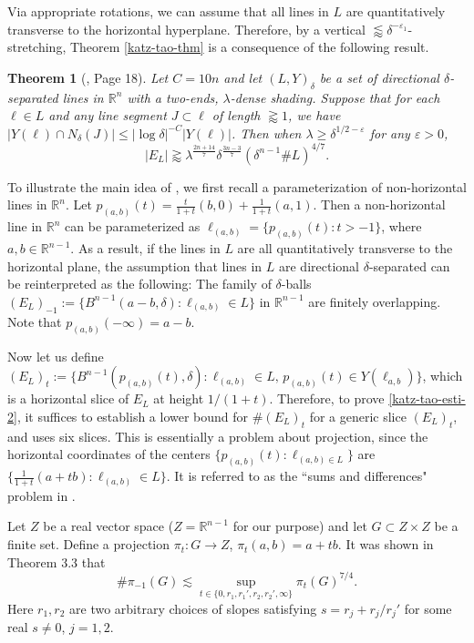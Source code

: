 \documentclass{amsart}
\numberwithin{equation}{section}
\newtheorem{theorem}{Theorem}[section]
\newcommand{\de}{\delta}
\newcommand{\e}{\varepsilon}
\newcommand{\la}{\lambda}
\newcommand{\ZR}{\mathbb{R}}
\begin{document}
Via appropriate rotations, we can assume that all lines in $L$ are quantitatively transverse to the horizontal hyperplane. 
Therefore, by a vertical $\lessapprox\de^{-\e_1}$-stretching, Theorem \ref{katz-tao-thm} is a consequence of the following result.
\begin{theorem}[\cite{Katz-Tao-Kakeya-maximal}, Page 18]
\label{katz-tao-thm-2}
Let $C=10n$ and let $(L,Y)_\de$ be a set of directional $\de$-separated lines in $\ZR^n$ with a two-ends, $\la$-dense shading. 
Suppose that for each $\ell\in L$ and any line segment $J\subset\ell$ of length $\gtrapprox1$, we have $|Y(\ell)\cap N_\de(J)|\leq|\log\de|^{-C}|Y(\ell)|$.
Then when $\la\geq\de^{1/2-\e}$ for any $\e>0$,
\begin{equation}
\label{katz-tao-esti-2}
    |E_L|\gtrapprox \la^\frac{2n+14}{7}\de^{\frac{3n-3}{7}}(\de^{n-1}\#L)^{4/7}.
\end{equation}
\end{theorem}

\smallskip

To illustrate the main idea of \cite{Katz-Tao-Kakeya-maximal}, we first recall a parameterization of non-horizontal lines in $\ZR^n$. Let $p_{(a,b)}(t)=\frac{t}{1+t}(b,0)+\frac{1}{1+t}(a,1)$. Then a non-horizontal line in $\ZR^n$ can be parameterized as $\ell_{(a,b)}=\{p_{(a,b)}(t):t>-1\}$, where $a,b\in\ZR^{n-1}$.
As a result, if the lines in $L$ are all quantitatively transverse to the horizontal plane, the assumption that lines in $L$ are directional $\de$-separated can be reinterpreted as the following: 
The family of $\de$-balls $(E_L)_{-1}:=\{B^{n-1}(a-b,\de): \ell_{(a,b)}\in L\}$ in $\ZR^{n-1}$ are finitely overlapping.
Note that $p_{(a,b)}(-\infty)=a-b$.

Now let us define $(E_L)_{t}:=\{B^{n-1}(p_{(a,b)}(t),\de): \ell_{(a,b)}\in L,\, p_{(a,b)}(t)\in Y(\ell_{a,b})\}$, which is a horizontal slice of $E_L$ at height $1/(1+t)$.
Therefore, to prove \eqref{katz-tao-esti-2}, it suffices to establish a lower bound for $\#(E_L)_t$ for a generic slice $(E_L)_t$, and \cite{Katz-Tao-Kakeya-maximal} uses six slices.
This is essentially a problem about projection, since the horizontal coordinates of the centers $\{p_{(a,b)}(t):\ell_{(a,b)\in L}\}$ are $\{\frac{1}{1+t}(a+tb):\ell_{(a,b)}\in L\}$.
It is referred to as the ``sums and differences" problem in \cite{Katz-Tao-Kakeya-maximal}.


Let $Z$ be a real vector space ($Z=\ZR^{n-1}$ for our purpose) and let $G\subset Z\times Z$ be a finite set.
Define a projection $\pi_t:G\to Z$, $\pi_t(a,b)=a+tb$.
It was shown in \cite{Katz-Tao-Kakeya-maximal} Theorem 3.3 that
\begin{equation}
\label{sum-difference}
    \#\pi_{-1}(G)\lesssim \sup_{t\in\{0,r_1,r_1',r_2,r_2',\infty\}}\pi_t(G)^{7/4}.
\end{equation}
Here $r_1, r_2$ are two arbitrary choices of slopes satisfying $s=r_j+r_j/r_j'$ for some real $s\not=0$, $j=1,2$.
\end{document}
